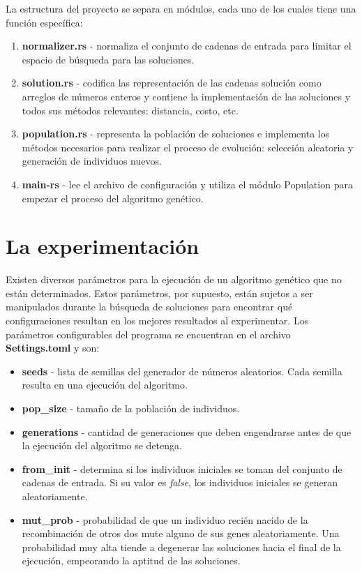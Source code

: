 \documentclass{article}
\begin{document}
  La estructura del proyecto se separa en módulos, cada uno de los cuales tiene una función específica:
  \begin{enumerate}
    \item \textbf{normalizer.rs} - normaliza el conjunto de cadenas de entrada para limitar el espacio de búsqueda
      para las soluciones.
    \item \textbf{solution.rs} - codifica las representación de las cadenas solución como arreglos de números enteros 
      y contiene la implementación de las soluciones y todos sus métodos relevantes: distancia, costo, etc.
    \item \textbf{population.rs} - representa la población de soluciones e implementa los métodos necesarios para
      realizar el proceso de evolución: selección aleatoria y generación de individuos nuevos.
    \item \textbf{main-rs} - lee el archivo de configuración y utiliza el módulo Population para empezar el proceso
      del algoritmo genético.
  \end{enumerate}
\section{La experimentación}
  Existen diversos parámetros para la ejecución de un algoritmo genético que no están determinados. Estos parámetros,
  por supuesto, están sujetos a ser manipulados durante la búsqueda de soluciones para encontrar qué configuraciones
  resultan en los mejores resultados al experimentar. Los parámetros configurables del programa se encuentran en el archivo 
  \textbf{Settings.toml} y son:
  \begin{itemize}
    \item \textbf{seeds} - lista de semillas del generador de números aleatorios. Cada semilla resulta en una ejecución 
      del algoritmo.
    \item \textbf{pop\_size} - tamaño de la población de individuos.
    \item \textbf{generations} - cantidad de generaciones que deben engendrarse antes de que la ejecución del algoritmo se detenga.
    \item \textbf{from\_init} - determina si los individuos iniciales se toman del conjunto de cadenas de entrada. Si su valor
      es \textit{false}, los individuos iniciales se generan aleatoriamente.
    \item \textbf{mut\_prob} - probabilidad de que un individuo recién nacido de la recombinación de otros dos mute alguno
      de sus genes aleatoriamente. Una probabilidad muy alta tiende a degenerar las soluciones hacia el final de la ejecución,
      empeorando la aptitud de las soluciones.
  \end{itemize}
\end{document}
